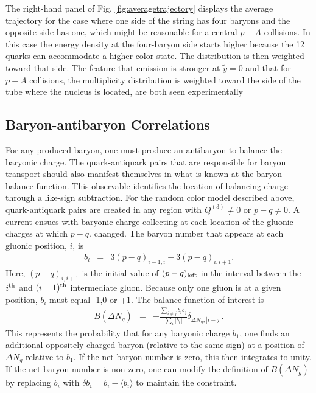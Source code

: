 \documentclass[aps, prc, 12pt, nofootinbib, showpacs, superscriptaddress, tightenlines, groupedaddress]{revtex4-2}
\begin{document}
The right-hand panel of Fig. \ref{fig:averagetrajectory} displays the average trajectory for the case where one side of the string has four baryons and the opposite side has one, which might be reasonable for a central $p-A$ collisions. In this case the energy density at the four-baryon side starts higher because the 12 quarks can accommodate a higher color state. The distribution is then weighted toward that side. The feature that emission is stronger at $\tilde{y}=0$ and that for $p-A$ collisions, the multiplicity distribution is weighted toward the side of the tube where the nucleus is located, are both seen experimentally \cite{BRAHMS:2003wwg,PHOBOS:2010eyu,ALICE:2016fbt,ALICE:2013jfw,ALICE:2022imr}

\subsection{Baryon-antibaryon Correlations}

For any produced baryon, one must produce an antibaryon to balance the baryonic charge. The quark-antiquark pairs that are responsible for baryon transport should also manifest themselves in what is known at the baryon balance function. This observable identifies the location of balancing charge through a like-sign subtraction. For the random color model described above, quark-antiquark pairs are created in any region with $Q^{(3)}\ne 0$ or $p-q\ne 0$. A current ensues with baryonic charge collecting at each location of the gluonic charges at which $p-q$. changed. The baryon number that appears at each gluonic position, $i$, is 
\begin{eqnarray}
 b_i&=&3(p-q)_{i-1,i}-3(p-q)_{i,i+1}.
 \end{eqnarray}
 Here, $(p-q)_{i,i+1}$ is the initial value of $(p-q)_{\rm left}$ in the interval between the $i^{\rm th}$ and $(i+1)^{\rm th}$ intermediate gluon. Because only one gluon is at a given position, $b_i$ must equal -1,0 or +1. The balance function of interest is
\begin{eqnarray}
B(\Delta N_g)&=&-\frac{\sum_{i\ne j}b_ib_j}{\sum_i|b_i|}\delta_{\Delta N_g,|i-j|}.
\end{eqnarray}
This represents the probability that for any baryonic charge $b_1$, one finds an additional oppositely charged baryon (relative to the same sign) at a position of $\Delta N_g$ relative to $b_1$. If the net baryon number is zero, this then integrates to unity. If the net baryon number is non-zero, one can modify the definition of $B(\Delta N_g)$ by replacing $b_i$ with $\delta b_i=b_i-\langle b_i\rangle$ to maintain the constraint. 
\end{document}
